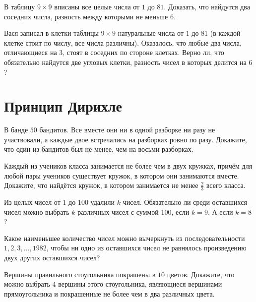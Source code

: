 \documentclass[12pt]{article}
\begin{document}
\begin{task} В таблицу $9 \times 9$ вписаны все целые числа от $1$ до $81$. Доказать, что найдутся два соседних числа, разность между которыми не меньше $6$. 
\end{task}

\begin{task} 
Вася записал в клетки таблицы $9 \times 9$ натуральные числа от $1$ до $81$ (в каждой клетке стоит по числу, все числа различны). Оказалось, что любые два числа, отличающиеся на $3$, стоят в соседних по стороне клетках. Верно ли, что обязательно найдутся две угловых клетки, разность чисел в которых делится на $6$?
\end{task}




\section*{Принцип Дирихле}

\begin{task}
В банде $50$ бандитов. Все вместе они ни в одной разборке ни разу не участвовали, а каждые двое встречались на разборках ровно по разу. Докажите, что один из бандитов был не менее, чем на восьми разборках. 
\end{task}

\begin{task} Каждый из учеников класса занимается не более чем в двух кружках, причём для любой пары учеников существует кружок, в котором они занимаются вместе. Докажите, что найдётся кружок, в котором занимается не менее $\frac{2}{3}$ всего класса.
\end{task}

\begin{task} Из целых чисел от $1$ до $100$ удалили $k$ чисел. Обязательно ли среди оставшихся чисел можно выбрать $k$ различных чисел с суммой 100, если $k = 9$. А если $k = 8$?
\end{task}

\begin{task} Какое наименьшее количество чисел можно вычеркнуть из последовательности $1, 2, 3, \dots, 1982$, чтобы ни одно из оставшихся чисел не равнялось произведению двух других оставшихся чисел?
\end{task}

\begin{task} Вершины правильного стоугольника покрашены в $10$ цветов. Докажите, что можно выбрать $4$ вершины этого стоугольника, являющиеся вершинами прямоугольника и покрашенные не более чем в два различных цвета.
\end{task}
\end{document}
